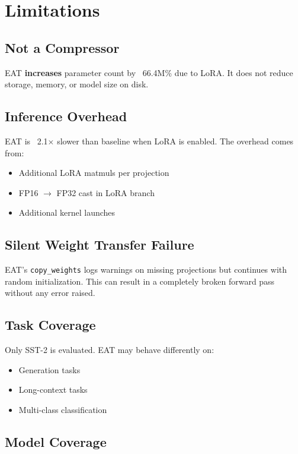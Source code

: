 
\section{Limitations}

\subsection{Not a Compressor}

EAT \textbf{increases} parameter count by ~66.4M\% due to LoRA. It 
does not reduce storage, memory, or model size on disk.

\subsection{Inference Overhead}

EAT is ~2.1$\times$ slower than baseline when LoRA is enabled. 
The overhead comes from:

\begin{itemize}
\item Additional LoRA matmuls per projection
\item FP16 $\to$ FP32 cast in LoRA branch
\item Additional kernel launches

\end{itemize}
\subsection{Silent Weight Transfer Failure}

EAT's \texttt{copy\_weights} logs warnings on missing projections but continues 
with random initialization. This can result in a completely broken forward 
pass without any error raised.

\subsection{Task Coverage}

Only SST-2 is evaluated. EAT may behave differently on:

\begin{itemize}
\item Generation tasks
\item Long-context tasks
\item Multi-class classification

\end{itemize}
\subsection{Model Coverage}

